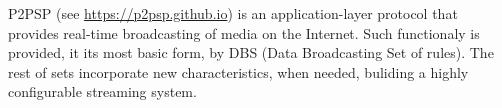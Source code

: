 P2PSP (see \url{https://p2psp.github.io}) is an application-layer
protocol that provides real-time broadcasting of media on the
Internet. Such functionaly is provided, it its most basic form, by DBS
(Data Broadcasting Set of rules). The rest of sets incorporate new
characteristics, when needed, buliding a highly configurable streaming
system.
